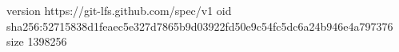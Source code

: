 version https://git-lfs.github.com/spec/v1
oid sha256:52715838d1feaec5e327d7865b9d03922fd50e9c54fc5dc6a24b946e4a797376
size 1398256
